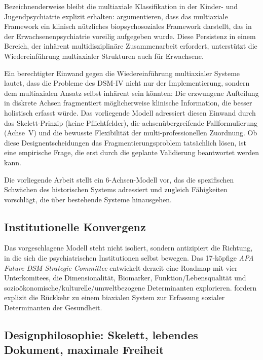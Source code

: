 \documentclass[11pt,a4paper]{article}
\begin{document}
Bezeichnenderweise bleibt die multiaxiale Klassifikation in der Kinder- und Jugendpsychiatrie explizit erhalten: \citet{BJPsychAdv2024} argumentieren, dass das multiaxiale Framework ein \glqq klinisch n\"utzliches biopsychosoziales Framework\grqq{} darstellt, das in der Erwachsenenpsychiatrie voreilig aufgegeben wurde. Diese Persistenz in einem Bereich, der inh\"arent multidisziplin\"are Zusammenarbeit erfordert, unterst\"utzt die Wiedereinf\"uhrung multiaxialer Strukturen auch f\"ur Erwachsene.

Ein berechtigter Einwand gegen die Wiedereinf\"uhrung multiaxialer Systeme lautet, dass die Probleme des DSM-IV nicht nur der Implementierung, sondern dem multiaxialen Ansatz selbst inh\"arent sein k\"onnten: Die erzwungene Aufteilung in diskrete Achsen fragmentiert m\"oglicherweise klinische Information, die besser holistisch erfasst w\"urde. Das vorliegende Modell adressiert diesen Einwand durch das Skelett-Prinzip (keine Pflichtfelder), die achsen\"ubergreifende Fallformulierung (Achse~V) und die bewusste Flexibilit\"at der multi-professionellen Zuordnung. Ob diese Designentscheidungen das Fragmentierungsproblem tats\"achlich l\"osen, ist eine empirische Frage, die erst durch die geplante Validierung beantwortet werden kann.

Die vorliegende Arbeit stellt ein 6-Achsen-Modell vor, das die spezifischen Schw\"achen des historischen Systems adressiert und zugleich F\"ahigkeiten vorschl\"agt, die \"uber bestehende Systeme hinausgehen.

\subsection{Institutionelle Konvergenz}

Das vorgeschlagene Modell steht nicht isoliert, sondern antizipiert die Richtung, in die sich die psychiatrischen Institutionen selbst bewegen. Das 17-k\"opfige \textit{APA Future DSM Strategic Committee} entwickelt derzeit eine \glqq Roadmap\grqq{} mit vier Unterkomitees, die Dimensionalit\"at, Biomarker, Funktion/Lebensqualit\"at und sozio\"okonomische/kulturelle/umweltbezogene Determinanten explorieren. \citet{ErlichFirst2025} fordern explizit die R\"uckkehr zu einem biaxialen System zur Erfassung sozialer Determinanten der Gesundheit.


\subsection{Designphilosophie: Skelett, lebendes Dokument, maximale Freiheit}
\label{sec:designphilosophie}
\end{document}

